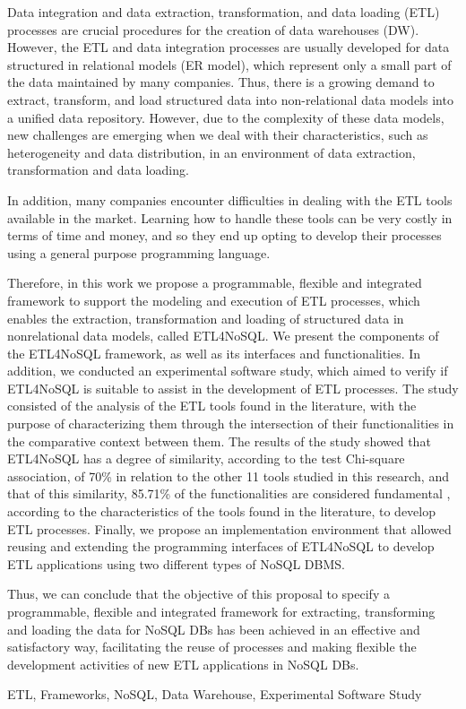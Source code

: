 Data integration and data extraction, transformation, and data loading (ETL) processes are crucial procedures for the creation of data warehouses (DW). However, the ETL and data integration processes are usually developed for data structured in relational models (ER model), which represent only a small part of the data maintained by many companies. Thus, there is a growing demand to extract, transform, and load structured data into non-relational data models into a unified data repository. However, due to the complexity of these data models, new challenges are emerging when we deal with their characteristics, such as heterogeneity and data distribution, in an environment of data extraction, transformation and data loading.

In addition, many companies encounter difficulties in dealing with the ETL tools available in the market. Learning how to handle these tools can be very costly in terms of time and money, and so they end up opting to develop their processes using a general purpose programming language.

Therefore, in this work we propose a programmable, flexible and integrated framework to support the modeling and execution of ETL processes, which enables the extraction, transformation and loading of structured data in nonrelational data models, called ETL4NoSQL. We present the components of the ETL4NoSQL framework, as well as its interfaces and functionalities. In addition, we conducted an experimental software study, which aimed to verify if ETL4NoSQL is suitable to assist in the development of ETL processes. The study consisted of the analysis of the ETL tools found in the literature, with the purpose of characterizing them through the intersection of their functionalities in the comparative context between them. The results of the study showed that ETL4NoSQL has a degree of similarity, according to the test Chi-square association, of 70\% in relation to the other 11 tools studied in this research, and that of this similarity, 85.71\% of the functionalities are considered fundamental , according to the characteristics of the tools found in the literature, to develop ETL processes. Finally, we propose an implementation environment that allowed reusing and extending the programming interfaces of ETL4NoSQL to develop ETL applications using two different types of NoSQL DBMS.

Thus, we can conclude that the objective of this proposal to specify a programmable, flexible and integrated framework for extracting, transforming and loading the data for NoSQL DBs has been achieved in an effective and satisfactory way, facilitating the reuse of processes and making flexible the development activities of new ETL applications in NoSQL DBs.

\begin{keywords}
	ETL, Frameworks, NoSQL, Data Warehouse, Experimental Software Study
\end{keywords}
